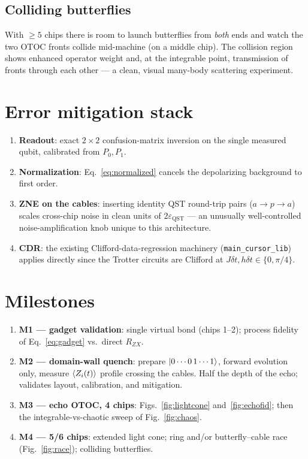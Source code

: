 \documentclass[11pt]{article}
\newcommand{\eqst}{\varepsilon_{\mathrm{QST}}}
\begin{document}
\subsection{Colliding butterflies}
With $\geq 5$ chips there is room to launch butterflies from \emph{both} ends
and watch the two OTOC fronts collide mid-machine (on a middle chip). The
collision region shows enhanced operator weight and, at the integrable point,
transmission of fronts through each other --- a clean, visual many-body
scattering experiment.

\section{Error mitigation stack}

\begin{enumerate}
  \item \textbf{Readout}: exact $2\times2$ confusion-matrix inversion on the
  single measured qubit, calibrated from $P_0, P_1$.
  \item \textbf{Normalization}: Eq.~\eqref{eq:normalized} cancels the
  depolarizing background to first order.
  \item \textbf{ZNE on the cables}: inserting identity QST round-trip pairs
  ($a \to p \to a$) scales cross-chip noise in clean units of $2\eqst$ --- an
  unusually well-controlled noise-amplification knob unique to this
  architecture.
  \item \textbf{CDR}: the existing Clifford-data-regression machinery
  (\texttt{main\_cursor\_lib}) applies directly since the Trotter circuits are
  Clifford at $J\delta t, h\delta t \in \{0, \pi/4\}$.
\end{enumerate}

\section{Milestones}

\begin{enumerate}
  \item \textbf{M1 --- gadget validation}: single virtual bond (chips 1--2);
  process fidelity of Eq.~\eqref{eq:gadget} vs.\ direct $R_{ZX}$.
  \item \textbf{M2 --- domain-wall quench}: prepare
  $\ket{0\cdots0\,1\cdots1}$, forward evolution only, measure
  $\expval{Z_i(t)}$ profile crossing the cables. Half the depth of the echo;
  validates layout, calibration, and mitigation.
  \item \textbf{M3 --- echo OTOC, 4 chips}: Figs.~\ref{fig:lightcone}
  and~\ref{fig:echofid}; then the integrable-vs-chaotic sweep of
  Fig.~\ref{fig:chaos}.
  \item \textbf{M4 --- 5/6 chips}: extended light cone; ring and/or
  butterfly--cable race (Fig.~\ref{fig:race}); colliding butterflies.
\end{enumerate}
\end{document}
